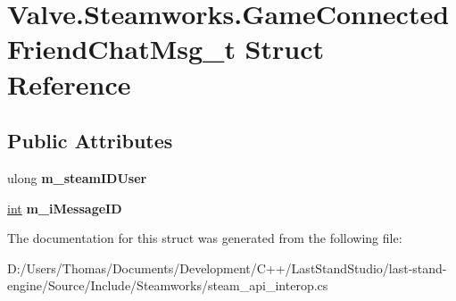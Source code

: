 \hypertarget{structValve_1_1Steamworks_1_1GameConnectedFriendChatMsg__t}{}\section{Valve.\+Steamworks.\+Game\+Connected\+Friend\+Chat\+Msg\+\_\+t Struct Reference}
\label{structValve_1_1Steamworks_1_1GameConnectedFriendChatMsg__t}
\subsection*{Public Attributes}
\begin{DoxyCompactItemize}
\item 
\hypertarget{structValve_1_1Steamworks_1_1GameConnectedFriendChatMsg__t_a236e9e20ccb22e616ec65ff9ffbac546}{}ulong {\bfseries m\+\_\+steam\+I\+D\+User}\label{structValve_1_1Steamworks_1_1GameConnectedFriendChatMsg__t_a236e9e20ccb22e616ec65ff9ffbac546}

\item 
\hypertarget{structValve_1_1Steamworks_1_1GameConnectedFriendChatMsg__t_a0296e62311b9311625fef0fb3d9cf0a2}{}\hyperlink{SDL__thread_8h_a6a64f9be4433e4de6e2f2f548cf3c08e}{int} {\bfseries m\+\_\+i\+Message\+I\+D}\label{structValve_1_1Steamworks_1_1GameConnectedFriendChatMsg__t_a0296e62311b9311625fef0fb3d9cf0a2}

\end{DoxyCompactItemize}


The documentation for this struct was generated from the following file\+:\begin{DoxyCompactItemize}
\item 
D\+:/\+Users/\+Thomas/\+Documents/\+Development/\+C++/\+Last\+Stand\+Studio/last-\/stand-\/engine/\+Source/\+Include/\+Steamworks/steam\+\_\+api\+\_\+interop.\+cs\end{DoxyCompactItemize}
